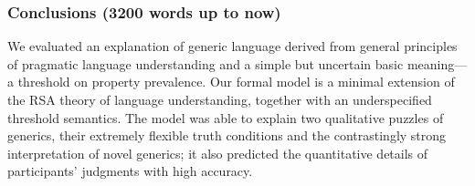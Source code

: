 \documentclass[10pt,letterpaper]{article}
\begin{document}
%

\subsubsection*{Conclusions (3200 words up to now)}


We evaluated an explanation of generic language derived from general principles of pragmatic language understanding and a simple but uncertain basic meaning---a threshold on property prevalence.
Our formal model is a minimal extension of the RSA theory of language understanding, together with an underspecified threshold semantics.
The model was able to explain two qualitative puzzles of generics, their extremely flexible truth conditions and the contrastingly strong interpretation of novel generics; it also predicted the quantitative details of participants' judgments with high accuracy.
\end{document}
